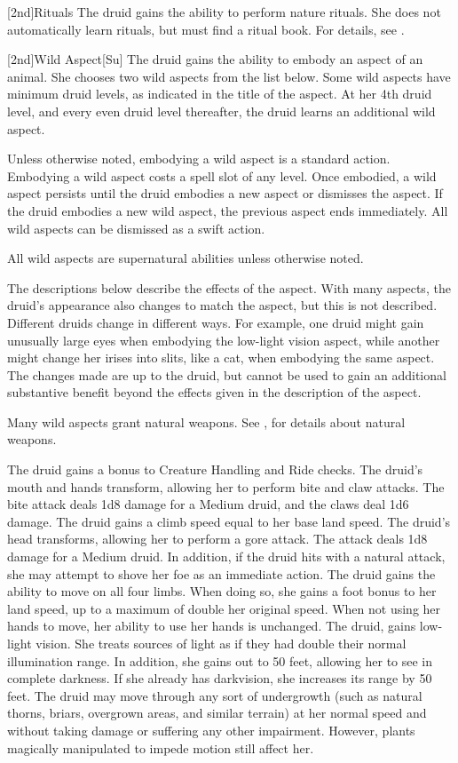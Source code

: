 [2nd]{Rituals}
The druid gains the ability to perform nature rituals.
She does not automatically learn rituals, but must find a ritual book.
For details, see .

[2nd]{Wild Aspect}[Su]
The druid gains the ability to embody an aspect of an animal.
She chooses two wild aspects from the list below.
Some wild aspects have minimum druid levels, as indicated in the title of the aspect.
At her 4th druid level, and every even druid level thereafter, the druid learns an additional wild aspect.

Unless otherwise noted, embodying a wild aspect is a standard action.
Embodying a wild aspect costs a spell slot of any level.
Once embodied, a wild aspect persists until the druid embodies a new aspect or dismisses the aspect.
If the druid embodies a new wild aspect, the previous aspect ends immediately.
All wild aspects can be dismissed as a swift action.

All wild aspects are supernatural abilities unless otherwise noted.

The descriptions below describe the effects of the aspect.
With many aspects, the druid's appearance also changes to match the aspect, but this is not described.
Different druids change in different ways.
For example, one druid might gain unusually large eyes when embodying the low-light vision aspect, while another might change her irises into slits, like a cat, when embodying the same aspect.
The changes made are up to the druid, but cannot be used to gain an additional substantive benefit beyond the effects given in the description of the aspect.

Many wild aspects grant natural weapons.
See , for details about natural weapons.

The druid gains a  bonus to Creature Handling and Ride checks.
The druid's mouth and hands transform, allowing her to perform bite and claw attacks.
The bite attack deals 1d8 damage for a Medium druid, and the claws deal 1d6 damage.
The druid gains a climb speed equal to her base land speed.
The druid's head transforms, allowing her to perform a gore attack.
The attack deals 1d8 damage for a Medium druid.
In addition, if the druid hits with a natural attack, she may attempt to shove her foe as an immediate action.
The druid gains the ability to move on all four limbs.
When doing so, she gains a  foot bonus to her land speed, up to a maximum of double her original speed.
When not using her hands to move, her ability to use her hands is unchanged.
The druid, gains low-light vision.
She treats sources of light as if they had double their normal illumination range.
In addition, she gains  out to 50 feet, allowing her to see in complete darkness.
If she already has darkvision, she increases its range by 50 feet.
The druid may move through any sort of undergrowth (such as natural thorns, briars, overgrown areas, and similar terrain) at her normal speed and without taking damage or suffering any other impairment.
However, plants magically manipulated to impede motion still affect her.

